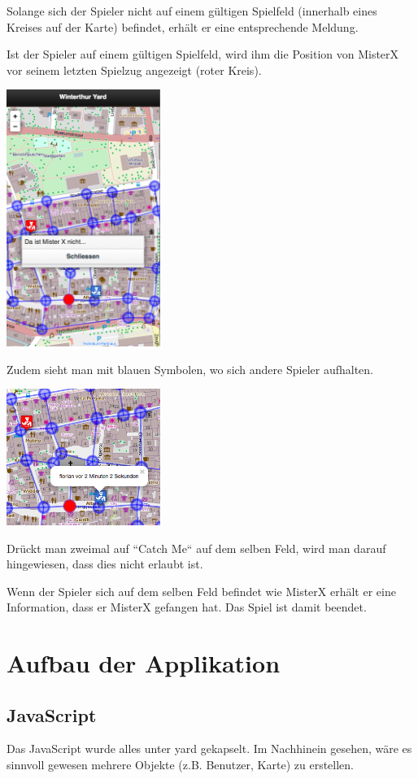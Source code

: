 \documentclass[11pt]{article}
\begin{document}
Solange sich der Spieler nicht auf einem gültigen Spielfeld (innerhalb eines Kreises auf der Karte) befindet, erhält er eine entsprechende Meldung. 

Ist der Spieler auf einem gültigen Spielfeld, wird ihm die Position von MisterX vor seinem letzten Spielzug angezeigt (roter Kreis). 

\includegraphics[width=5cm]{Bilder/MeldungMisterXNicht.png}

Zudem sieht man mit blauen Symbolen, wo sich andere Spieler aufhalten. 

\includegraphics[width=5cm]{Bilder/AndererSpieler.png}


Drückt man zweimal auf ``Catch Me`` auf dem selben Feld, wird man darauf hingewiesen, dass dies nicht erlaubt ist. 

Wenn der Spieler sich auf dem selben Feld befindet wie MisterX erhält er eine Information, dass er MisterX gefangen hat. Das Spiel ist damit beendet. 


\section{Aufbau der Applikation}

\subsection{JavaScript}
Das JavaScript wurde alles unter yard gekapselt. Im Nachhinein gesehen, wäre es sinnvoll gewesen mehrere Objekte (z.B. Benutzer, Karte) zu erstellen. 
\end{document}
